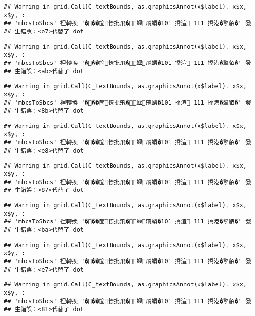 \documentclass[
]{article}
\begin{document}
\begin{verbatim}
## Warning in grid.Call(C_textBounds, as.graphicsAnnot(x$label), x$x, x$y, :
## 'mbcsToSbcs' 裡轉換 '���箇憭批飛�蝘飛蝟�101 撟渲 111 撟港�摮貊�' 發
## 生錯誤：<e7>代替了 dot
\end{verbatim}

\begin{verbatim}
## Warning in grid.Call(C_textBounds, as.graphicsAnnot(x$label), x$x, x$y, :
## 'mbcsToSbcs' 裡轉換 '���箇憭批飛�蝘飛蝟�101 撟渲 111 撟港�摮貊�' 發
## 生錯誤：<ab>代替了 dot
\end{verbatim}

\begin{verbatim}
## Warning in grid.Call(C_textBounds, as.graphicsAnnot(x$label), x$x, x$y, :
## 'mbcsToSbcs' 裡轉換 '���箇憭批飛�蝘飛蝟�101 撟渲 111 撟港�摮貊�' 發
## 生錯誤：<8b>代替了 dot
\end{verbatim}

\begin{verbatim}
## Warning in grid.Call(C_textBounds, as.graphicsAnnot(x$label), x$x, x$y, :
## 'mbcsToSbcs' 裡轉換 '���箇憭批飛�蝘飛蝟�101 撟渲 111 撟港�摮貊�' 發
## 生錯誤：<e8>代替了 dot
\end{verbatim}

\begin{verbatim}
## Warning in grid.Call(C_textBounds, as.graphicsAnnot(x$label), x$x, x$y, :
## 'mbcsToSbcs' 裡轉換 '���箇憭批飛�蝘飛蝟�101 撟渲 111 撟港�摮貊�' 發
## 生錯誤：<87>代替了 dot
\end{verbatim}

\begin{verbatim}
## Warning in grid.Call(C_textBounds, as.graphicsAnnot(x$label), x$x, x$y, :
## 'mbcsToSbcs' 裡轉換 '���箇憭批飛�蝘飛蝟�101 撟渲 111 撟港�摮貊�' 發
## 生錯誤：<ba>代替了 dot
\end{verbatim}

\begin{verbatim}
## Warning in grid.Call(C_textBounds, as.graphicsAnnot(x$label), x$x, x$y, :
## 'mbcsToSbcs' 裡轉換 '���箇憭批飛�蝘飛蝟�101 撟渲 111 撟港�摮貊�' 發
## 生錯誤：<e7>代替了 dot
\end{verbatim}

\begin{verbatim}
## Warning in grid.Call(C_textBounds, as.graphicsAnnot(x$label), x$x, x$y, :
## 'mbcsToSbcs' 裡轉換 '���箇憭批飛�蝘飛蝟�101 撟渲 111 撟港�摮貊�' 發
## 生錯誤：<81>代替了 dot
\end{verbatim}
\end{document}
